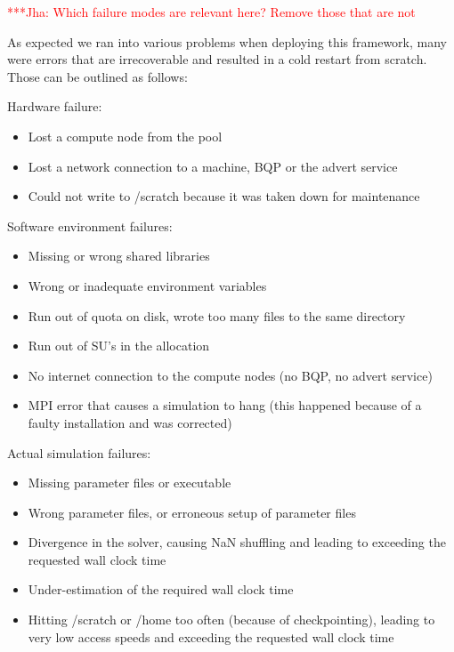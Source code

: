 \documentclass[conference,final]{IEEEtran}
\newcommand{\jhanote}[1]{ {\textcolor{red} { ***Jha: #1 }}}
\begin{document}
\jhanote{Which failure modes are relevant here? Remove those that are
  not}

As expected we ran into various problems when deploying this
framework, many were errors that are irrecoverable and resulted in a
cold restart from scratch. Those can be outlined as follows:

Hardware failure:
\begin{itemize}
\item{Lost a compute node from the pool}
\item{Lost a network connection to a machine, BQP or the advert service}
\item{Could not write to /scratch because it was taken down for maintenance}
\end{itemize}

Software environment failures:
\begin{itemize}
\item{Missing or wrong shared libraries}
\item{Wrong or inadequate environment variables}
\item{Run out of quota on disk, wrote too many files to the same directory}
\item{Run out of SU's in the allocation}
\item{No internet connection to the compute nodes (no BQP, no advert service)}
\item{MPI error that causes a simulation to hang (this happened because of a faulty installation and was corrected)}
\end{itemize}

Actual simulation failures:
\begin{itemize}
\item{Missing parameter files or executable}
\item{Wrong parameter files, or erroneous setup of parameter files}
\item{Divergence in the solver, causing NaN shuffling and leading to exceeding the requested wall clock time}
\item{Under-estimation of the required wall clock time}
\item{Hitting /scratch or /home too often (because of checkpointing), leading to very low access speeds and exceeding the requested wall clock time}
\end{itemize}
\end{document}
